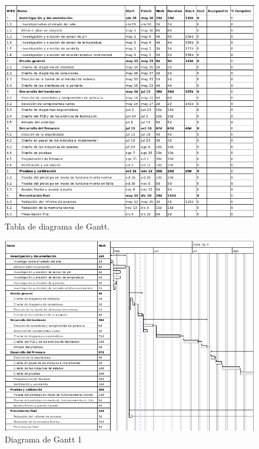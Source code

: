 \documentclass[
11pt, %
codirector, %
]{charter}
\begin{document}
\begin{figure}[htpb]
\centering 
\includegraphics[width=1\textwidth]{./Figuras/tasks.png}
\caption{Tabla de diagrama de Gantt.}
\label{fig:tasks}
\end{figure}

\begin{figure}[htpb]
\centering 
\includegraphics[width=1\textwidth]{./Figuras/gantt-1.png}
\caption{Diagrama de Gantt 1}
\label{fig:gantt-1}
\end{figure}
\end{document}
